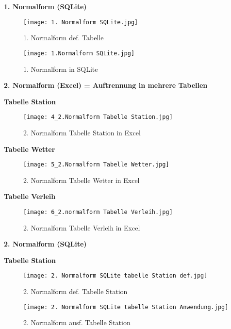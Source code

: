 \documentclass{article}
\begin{document}
\textbf{1. Normalform (SQLite)}

\begin{figure}[H]
    \centering
    \texttt{[image: 1. Normalform SQLite.jpg]}
    \caption{1. Normalform def. Tabelle}
    \label{fig:enter-label}
\end{figure}

\centering{\Huge\textbf{$\downarrow$}}

\begin{figure}[H]
    \centering
    \texttt{[image: 1.Normalform SQLite.jpg]}
    \label{fig: Tabelle zum Abfragen }
    \caption{1. Normalform in SQLite}
\end{figure}

\raggedright\textbf{2. Normalform (Excel) = Auftrennung in mehrere Tabellen}

\vspace{8pt}
\centering\textbf{Tabelle Station}

\begin{figure}[H]
    \centering
    \texttt{[image: 4\_2.Normalform Tabelle Station.jpg]}
    \caption{2. Normalform Tabelle Station in Excel}
    \label{fig:enter-label}
\end{figure}

\centering\textbf{Tabelle Wetter}


\begin{figure}[H]
    \centering
    \texttt{[image: 5\_2.Normalform Tabelle Wetter.jpg]}
    \caption{2. Normalform Tabelle Wetter in Excel}
    \label{fig:enter-label}
\end{figure}

\centering\textbf{Tabelle Verleih}

\begin{figure}[H]
    \centering
    \texttt{[image: 6\_2.normalform Tabelle Verleih.jpg]}
    \caption{2. Normalform Tabelle Verleih in Excel}
    \label{fig:enter-label}
\end{figure}

\newpage

\raggedright\textbf{2. Normalform (SQLite)}

\vspace{4pt}
\centering\textbf{Tabelle Station}


\begin{figure}[H]
      \begin{minipage}{0.45\textwidth}
      \texttt{[image: 2. Normalform SQLite tabelle Station def.jpg]}
      \caption{2. Normalform def. Tabelle Station }
      \end{minipage}\hfill
      \begin{minipage}{0.45\textwidth}
      \texttt{[image: 2. Normalform SQLite tabelle Station Anwendung.jpg]}
      \caption{2. Normalform ausf. Tabelle Station}  
      \end{minipage}
  \end{figure}  
\end{document}
